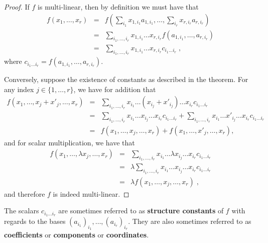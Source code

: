 \documentclass{report}
\theoremstyle{definition}
\theoremstyle{remark}
\begin{document}
\begin{proof}
    If $f$ is multi-linear, then by definition we must have that 
    \begin{eqnarray*}
       f(x_1, \dots, x_r) &=& f(\sum_{i_1} x_{1,i_1}a_{1,i_1}, \dots, \sum_{i_r} x_{r,i_r}a_{r,i_r}) \\
       &=&\sum_{i_1,\dots,i_r} x_{1,i_1}\dots x_{r,i_r}f(a_{1,i_1},\dots,a_{r,i_r}) \\
       &=& \sum_{i_1 , \dots, i_r} x_{1,i_1}\dots x_{r,i_r} c_{i_1 \dots i_r}\;,
    \end{eqnarray*}
    where $c_{i_1 \dots i_r} = f(a_{1,i_1},\dots,a_{r,i_r})$.
    
    \medskip
    Conversely, suppose the existence of constants as described in the theorem. For any index $j \in \{1,\dots,r\}$, we have for addition that 
        \begin{eqnarray*}
        f(x_1, \dots, x_j + x'_j, \dots, x_r) &=& \sum_{i_1,\dots,i_r}x_{i_1}\dots (x_{i_j}  +x'_{i_j})\dots x_{i_r} c_{i_1 \dots i_r} 
        \\
        &=& \sum_{i_1,\dots,i_r}x_{i_1}\dots x_{i_j}\dots x_{i_r} c_{i_1 \dots i_r} + \sum_{i_1,\dots,i_r}x_{i_1}\dots x'_{i_j}\dots x_{i_r} c_{i_1 \dots i_r} 
        \\
        &=& f(x_1,\dots,x_j,\dots,x_r) + f(x_1,\dots,x'_j,\dots,x_r),
    \end{eqnarray*}
    and for scalar multiplication, we have that 
    \begin{eqnarray*}
        f(x_1,\dots,\lambda x_j, \dots,x_r) &=& \sum_{i_1,\dots,i_r}x_{i_1}\dots \lambda x_{i_j}\dots x_{i_r} c_{i_1\dots i_r}\\
        &=& \lambda \sum_{i_1,\dots,i_r} x_{i_1}\dots x_{i_j}\dots x_{i_r} c_{i_1\dots i_r}\\
        &=& \lambda f(x_1,\dots,x_j,\dots,x_r)\;,
    \end{eqnarray*}
    and therefore $f$ is indeed multi-linear. 
\end{proof}


	
The scalars $c_{i_1\dots i_r}$ are sometimes referred to \cite{Cheng} as \textbf{structure constants} of $f$ with regards to the bases $(a_{i_1})_{i_1},\dots,(a_{i_r})_{i_r}$. They are also sometimes referred to \cite{Godement}  as \textbf{coefficients} or \textbf{components} or \textbf{coordinates}.
\end{document}
